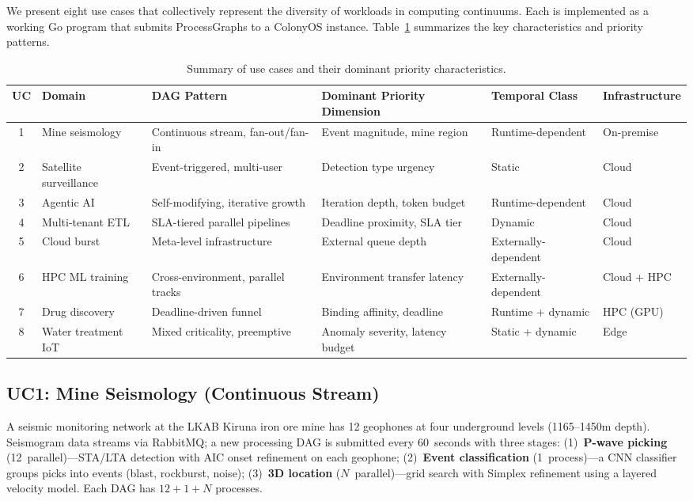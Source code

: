 \documentclass[conference]{IEEEtran}
\begin{document}
We present eight use cases that collectively represent the diversity of workloads in computing continuums. Each is implemented as a working Go program that submits ProcessGraphs to a ColonyOS instance. Table~\ref{tab:usecases} summarizes the key characteristics and priority patterns.

\begin{table}[t]
\caption{Summary of use cases and their dominant priority characteristics.}
\label{tab:usecases}
\centering
\small
\begin{tabular}{clllll}
\toprule
\textbf{UC} & \textbf{Domain} & \textbf{DAG Pattern} & \textbf{Dominant Priority Dimension} & \textbf{Temporal Class} & \textbf{Infrastructure} \\
\midrule
1 & Mine seismology     & Continuous stream, fan-out/fan-in  & Event magnitude, mine region     & Runtime-dependent  & On-premise \\
2 & Satellite surveillance & Event-triggered, multi-user      & Detection type urgency           & Static             & Cloud \\
3 & Agentic AI          & Self-modifying, iterative growth   & Iteration depth, token budget    & Runtime-dependent  & Cloud \\
4 & Multi-tenant ETL    & SLA-tiered parallel pipelines      & Deadline proximity, SLA tier     & Dynamic            & Cloud \\
5 & Cloud burst         & Meta-level infrastructure          & External queue depth             & Externally-dependent & Cloud \\
6 & HPC ML training     & Cross-environment, parallel tracks & Environment transfer latency     & Externally-dependent & Cloud + HPC \\
7 & Drug discovery      & Deadline-driven funnel             & Binding affinity, deadline       & Runtime + dynamic  & HPC (GPU) \\
8 & Water treatment IoT & Mixed criticality, preemptive      & Anomaly severity, latency budget & Static + dynamic   & Edge \\
\bottomrule
\end{tabular}
\end{table}

\subsection{UC1: Mine Seismology (Continuous Stream)}
\label{sec:uc1}

A seismic monitoring network at the LKAB Kiruna iron ore mine has 12 geophones at four underground levels (1165--1450m depth). Seismogram data streams via RabbitMQ; a new processing DAG is submitted every 60~seconds with three stages: (1)~\textbf{P-wave picking} (12~parallel)---STA/LTA detection with AIC onset refinement on each geophone; (2)~\textbf{Event classification} (1~process)---a CNN classifier groups picks into events (blast, rockburst, noise); (3)~\textbf{3D location} ($N$~parallel)---grid search with Simplex refinement using a layered velocity model. Each DAG has $12 + 1 + N$ processes.
\end{document}
